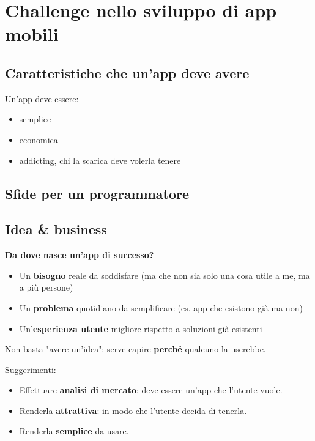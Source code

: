 
\section{Challenge nello sviluppo di app mobili}
\subsection{Caratteristiche che un'app deve avere}
\par Un'app deve essere:
\begin{itemize}
    \item semplice
    \item economica
    \item addicting, chi la scarica deve volerla tenere
\end{itemize}

\subsection{Sfide per un programmatore}

\subsection{Idea \& business}
\par \textbf{Da dove nasce un'app di successo?}
\begin{itemize}
    \item Un \textbf{bisogno} reale da soddisfare (ma che non sia solo una cosa utile a me, ma a più persone)
    \item Un \textbf{problema} quotidiano da semplificare (es. app che esistono già ma non)
    \item Un'\textbf{esperienza utente} migliore rispetto a soluzioni già esistenti
\end{itemize}
\par Non basta "avere un'idea": serve capire \textbf{perché} qualcuno la userebbe.
\par Suggerimenti:
\begin{itemize}
    \item Effettuare \textbf{analisi di mercato}: deve essere un'app che l'utente vuole.
    \item Renderla \textbf{attrattiva}: in modo che l'utente decida di tenerla.
    \item Renderla \textbf{semplice} da usare.
\end{itemize}

